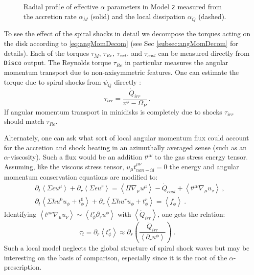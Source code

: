 \documentclass{emulateapj}
\newcommand{\al}{\alpha}
\newcommand{\eps}{\epsilon}
\newcommand{\Sig}{\Sigma}
\newcommand{\Om}{\Omega}
\newcommand{\Disco}{{\texttt{Disco}}}
\newcommand{\model}[1]{{Model \texttt{#1}}}
\newcommand{\ave}[1]{\left \langle #1 \right \rangle}
\begin{document}
\begin{figure}
\caption{\label{fi:alpha} Radial profile of effective $\al$ parameters in \model{2} measured from the accretion rate $\al_{\dot{M}}$ (solid) and the local dissipation $\al_{\dot{Q}}$ (dashed).}
\end{figure}

To see the effect of the spiral shocks in detail we decompose the torques acting on the disk according to \eqref{eq:angMomDecom} (see Sec \ref{subsec:angMomDecom} for details). Each of the torques $\tau_{\dot{M}}$, $\tau_{Re}$, $\tau_{ext}$, and $\tau_{cool}$ can be measured directly from \Disco{} output.  The Reynolds torque $\tau_{Re}$ in particular measures the angular momentum transport due to non-axisymmetric features.  One can estimate the torque due to spiral shocks from $\psi_Q$ directly \citep{Rafikov16}:
\begin{equation}
	\tau_{irr} = \frac{\dot{Q}_{irr}}{v^\phi - \Om_P} \ . \label{eq:tauRaf}
\end{equation}
If angular momentum transport in minidisks is completely due to shocks $\tau_{irr}$ should match $\tau_{Re}$.

Alternately, one can ask what sort of local angular momentum flux could account for the accretion and shock heating in an azimuthally averaged sense (such as an $\al$-viscosity).  Such a flux would be an addition $t^{\mu\nu}$ to the gas stress energy tensor.  Assuming, like the viscous stress tensor, $u_\mu t^{\mu\nu}_{non-id} = 0$ the energy and angular momentum conservation equations are modified to:
\begin{align}
	&\partial_t \ave{\Sig \eps u^\mu} + \partial_r \ave{\Sig \eps u^r} = \ave{\Pi \nabla_\mu u^\mu} - \dot{Q}_{cool} + \ave{t^{\mu\nu} \nabla_\mu u_\nu} \ ,\\
	&\partial_t \ave{\Sig h u^0 u_\phi + t^0_\phi} + \partial_r \ave{\Sig h u^r u_\phi + t^r_\phi} = \ave{f_\phi} \ .
\end{align}
Identifying $\ave{t^{\mu\nu} \nabla_\mu u_\nu} \sim \ave{t^r_\phi \partial_r u^\phi}$ with $\ave{\dot{Q}_{irr}}$, one gets the relation:
\begin{equation}
	\tau_{t} = \partial_r \ave{t^r_\phi} \approx \partial_r \left(\frac{\dot{Q}_{irr}}{\ave{\partial_r u^\phi}} \right)\ . \label{eq:tauLoc}
\end{equation}
Such a local model neglects the global structure of spiral shock waves but may be interesting on the basis of comparison,  especially since it is the root of the $\alpha$-prescription.
\end{document}
